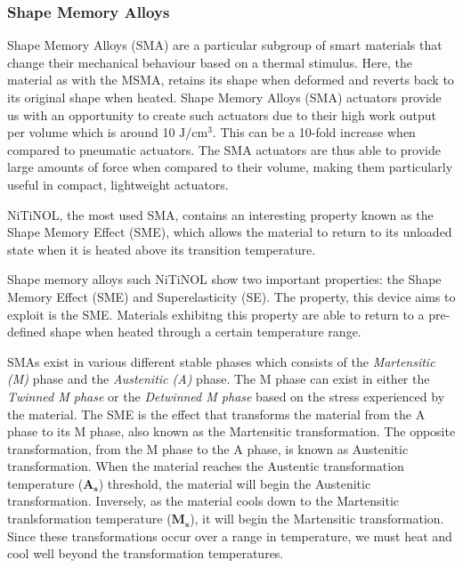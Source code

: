 \subsubsection{Shape Memory Alloys}
Shape Memory Alloys (SMA) are a particular subgroup of smart materials that change their mechanical behaviour based on a thermal stimulus. Here, the material as with the MSMA, retains its shape when deformed and reverts back to its original shape when heated. Shape Memory Alloys (SMA) actuators provide us with an opportunity to create such actuators due to their high work output per volume which is around 10 $\mathrm{J}/\mathrm{cm}^3$\cite{mohd_jani_review_2014}. This can be a 10-fold increase when compared to pneumatic actuators. The SMA actuators are thus able to provide large amounts of force when compared to their volume, making them particularly useful in compact, lightweight actuators.

NiTiNOL, the most used SMA, contains an interesting property known as the Shape Memory Effect (SME), which allows the material to return to its unloaded state when it is heated above its transition temperature.

Shape memory alloys such NiTiNOL show two important properties: the Shape Memory Effect (SME) and Superelasticity (SE)\cite{rao_design_2015}. The property, this device aims to exploit is the SME. Materials exhibitng this property are able to return to a pre-defined shape when heated through a certain temperature range.

SMAs exist in various different stable phases which consists of the \emph{Martensitic (M)} phase and the \emph{Austenitic (A)} phase. The M phase can exist in either the \emph{Twinned M phase} or the \emph{Detwinned M phase} based on the stress experienced by the material. The SME is the effect that transforms the material from the A phase to its M phase, also known as the Martensitic transformation. The opposite transformation, from the M phase to the A phase, is known as Austenitic transformation. When the material reaches the Austentic transformation temperature ($\mathbf{A_s}$) threshold, the material will begin the Austenitic transformation. Inversely, as the material cools down to the Martensitic tranlsformation temperature ($\mathbf{M_s}$), it will begin the Martensitic transformation. Since these transformations occur over a range in temperature, we must heat and cool well beyond the transformation temperatures.

